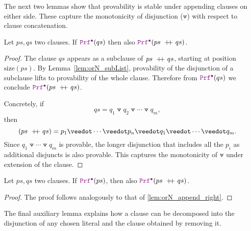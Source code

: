 The next two lemmas show that provability is stable under appending clauses on either side.
These capture the monotonicity of disjunction ($\veedot$) with respect to clause concatenation.

\begin{lemma}\label{lem:orN_append_right}
Let $ps,qs$ two clauses. If $\prfcl(qs)$ then also $\prfcl(ps \concat qs)$.
\begin{proof}
The clause $qs$ appears as a subclause of $ps ~+\!\!\!+~ qs$, starting at position $\mathrm{size}(ps)$.
By Lemma~\ref{lem:orN_subList}, provability of the disjunction of a subclause lifts to provability of the whole clause.
Therefore from $\prfcl(qs)$ we conclude $\prfcl(ps \concat qs)$.

Concretely, if
\[
  qs = q_1 \veedot q_2 \veedot \cdots \veedot q_m,
\]
then
\[
  (ps \concat qs) = p_1 \veedot \cdots \veedot p_n \veedot q_1 \veedot \cdots \veedot q_m.
\]
Since $q_1 \veedot \cdots \veedot q_m$ is provable, the longer disjunction that includes all the $p_i$ as additional disjuncts is also provable.
This captures the monotonicity of $\veedot$ under extension of the clause.
\end{proof}
\end{lemma}

\begin{lemma}\label{lem:orN_append_left}
Let $ps,qs$ two clauses. If $\prfcl(ps)$, then also $\prfcl(ps \concat qs)$.
\begin{proof}
The proof follows analogously to that of \cref{lem:orN_append_right}.
\end{proof}
\end{lemma}

The final auxiliary lemma explains how a clause can be decomposed into the disjunction
of any chosen literal and the clause obtained by removing it.

